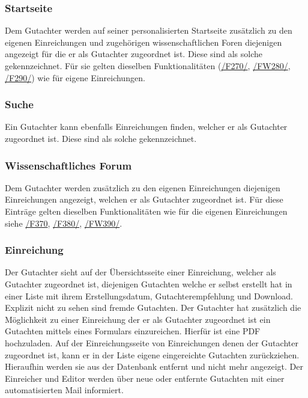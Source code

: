 \subsubsection{Startseite}
\begin{description}
     Dem Gutachter werden auf seiner personalisierten Startseite zusätzlich zu den eigenen
    Einreichungen und zugehörigen wissenschaftlichen Foren diejenigen angezeigt für die er als Gutachter
    zugeordnet ist. Diese sind als solche gekennzeichnet.
    Für sie gelten dieselben Funktionalitäten (\hyperref[funkt:270]{/F270/}, \hyperref[funkt:280]{/FW280/}, \hyperref[funkt:290]{/F290/})
    wie für eigene Einreichungen.
\end{description}

\subsubsection{Suche}
\begin{description}
     Ein Gutachter kann ebenfalls Einreichungen finden, welcher er als Gutachter
    zugeordnet ist. Diese sind als solche gekennzeichnet.
\end{description}

\subsubsection{Wissenschaftliches Forum}
\begin{description}
     Dem Gutachter werden zusätzlich zu den eigenen Einreichungen diejenigen Einreichungen angezeigt,
    welchen er als Gutachter zugeordnet ist. Für diese Einträge gelten dieselben Funktionalitäten wie für die
    eigenen Einreichungen siehe \hyperref[funkt:370]{/F370}, \hyperref[funkt:380]{/F380/}, \hyperref[funkt:390]{/FW390/}.
\end{description}

\subsubsection{Einreichung}
\begin{description}
     Der Gutachter sieht auf der Übersichtsseite einer Einreichung, welcher als Gutachter
    zugeordnet ist, diejenigen Gutachten welche er selbst erstellt hat in einer
    Liste mit ihrem Erstellungsdatum, Gutachterempfehlung und Download. Explizit nicht zu sehen sind fremde Gutachten.
     Der Gutachter hat zusätzlich die Möglichkeit zu einer Einreichung der er als Gutachter zugeordnet ist
    ein Gutachten mittels eines Formulars einzureichen. Hierfür ist eine PDF hochzuladen.
     Auf der Einreichungsseite von Einreichungen denen der Gutachter zugeordnet ist,
    kann er in der Liste eigene eingereichte Gutachten zurückziehen. Hieraufhin werden sie aus
    der Datenbank entfernt und nicht mehr angezeigt.
     Der Einreicher und Editor werden über neue oder entfernte Gutachten mit einer automatisierten
    Mail informiert.
\end{description}

